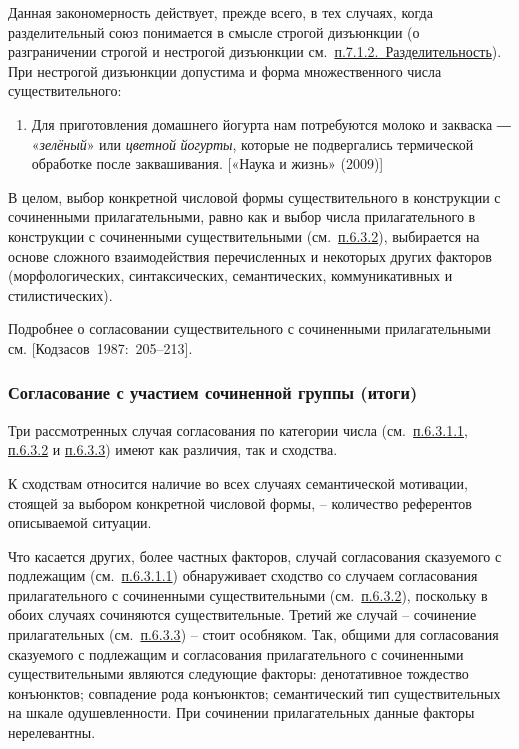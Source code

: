 Данная закономерность действует, прежде всего, в тех случаях, когда
разделительный союз понимается в смысле строгой дизъюнкции (о
разграничении строгой и нестрогой дизъюнкции
см.~\underline{п.7.1.2.~Разделительность}). При нестрогой дизъюнкции
допустима и форма множественного числа существительного:

\begin{enumerate}
\def\labelenumi{(\arabic{enumi})}
\setcounter{enumi}{154}
\item
  Для приготовления домашнего йогурта нам потребуются молоко и закваска
  ― «\emph{зелёный}» или \emph{цветной} \emph{йогурты}, которые не
  подвергались термической обработке после заквашивания. {[}«Наука и
  жизнь» (2009){]}
\end{enumerate}

В целом, выбор конкретной числовой формы существительного в конструкции
с сочиненными прилагательными, равно как и выбор числа прилагательного в
конструкции с сочиненными существительными (см.~\underline{п.6.3.2}),
выбирается на основе сложного взаимодействия перечисленных и некоторых
других факторов (морфологических, синтаксических, семантических,
коммуникативных и стилистических).

Подробнее о согласовании существительного с сочиненными прилагательными
см. {[}Кодзасов~1987:~205--213{]}.

\hypertarget{ux441ux43eux433ux43bux430ux441ux43eux432ux430ux43dux438ux435-ux441-ux443ux447ux430ux441ux442ux438ux435ux43c-ux441ux43eux447ux438ux43dux435ux43dux43dux43eux439-ux433ux440ux443ux43fux43fux44b-ux438ux442ux43eux433ux438}{%
\subsubsection{Согласование с участием сочиненной группы
(итоги)}\label{ux441ux43eux433ux43bux430ux441ux43eux432ux430ux43dux438ux435-ux441-ux443ux447ux430ux441ux442ux438ux435ux43c-ux441ux43eux447ux438ux43dux435ux43dux43dux43eux439-ux433ux440ux443ux43fux43fux44b-ux438ux442ux43eux433ux438}}

Три рассмотренных случая согласования по категории числа
(см.~\underline{п.6.3.1.1}, \underline{п.6.3.2} и \underline{п.6.3.3})
имеют как различия, так и сходства.

К сходствам относится наличие во всех случаях семантической мотивации,
стоящей за выбором конкретной числовой формы, -- количество референтов
описываемой ситуации.

Что касается других, более частных факторов, случай согласования
сказуемого с подлежащим (см.~\underline{п.6.3.1.1}) обнаруживает
сходство со случаем согласования прилагательного с сочиненными
существительными (см.~\underline{п.6.3.2}), поскольку в обоих случаях
сочиняются существительные. Третий же случай -- сочинение прилагательных
(см.~\underline{п.6.3.3}) -- стоит особняком. Так, общими для
согласования сказуемого с подлежащим и согласования прилагательного с
сочиненными существительными являются следующие факторы: денотативное
тождество конъюнктов; совпадение рода конъюнктов; семантический тип
существительных на шкале одушевленности. При сочинении прилагательных
данные факторы нерелевантны.

